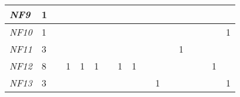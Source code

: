 \begin{table}[]
{\begin{tabular}{|l|l|l|l|l|l|l|l|l|l|l|l|l|l|l|l|l|}
\textit{NF9}  & 1                                                     &                                                       &    &                                                       &    &                                                       &                                                       &    &    &                                                       &    &                                                  &                                                  &    &    &    \\ \hline
\textit{NF10} & 1                                                     &                                                       &    &                                                       &    &                                                       &                                                       &    &    &                                                       &    &                                                  &                                                  &    &    & 1  \\ \hline
\textit{NF11} & 3                                                     &                                                       &    &                                                       &    &                                                       &                                                       &    &    &                                                       &    & 1                                                &                                                  &    &    &    \\ \hline
\textit{NF12} & 8                                                     &                                                       & 1  & 1                                                     & 1  &                                                       & 1                                                     & 1  &    &                                                       &    &                                                  &                                                  &    & 1  &    \\ \hline
\textit{NF13} & 3                                                     &                                                       &    &                                                       &    &                                                       &                                                       &    &    & 1                                                     &    &                                                  &                                                  &    &    & 1  \\ \hline

\end{tabular}}
\end{table}

